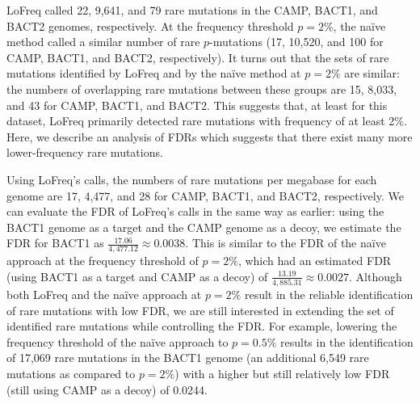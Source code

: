 LoFreq called 22, 9,641, and 79 rare mutations in the CAMP, BACT1, and BACT2 genomes, respectively. At the frequency threshold $p = 2\%$, the na\"ive method called a similar number of rare $p$-mutations (17, 10,520, and 100 for CAMP, BACT1, and BACT2, respectively). It turns out that the sets of rare mutations identified by LoFreq and by the na\"ive method at $p = 2\%$ are similar: the numbers of overlapping rare mutations between these groups are 15, 8,033, and 43 for CAMP, BACT1, and BACT2. This suggests that, at least for this dataset, LoFreq primarily detected rare mutations with frequency of at least 2\%. Here, we describe an analysis of FDRs which suggests that there exist many more lower-frequency rare mutations.

Using LoFreq's calls, the numbers of rare mutations per megabase for each genome are 17, 4,477, and 28 for CAMP, BACT1, and BACT2, respectively. We can evaluate the FDR of LoFreq's calls in the same way as earlier: using the BACT1 genome as a target and the CAMP genome as a decoy, we estimate the FDR for BACT1 as $\frac{17.06}{4,477.12} \approx 0.0038$. This is similar to the FDR of the na\"ive approach at the frequency threshold of $p = 2\%$, which had an estimated FDR (using BACT1 as a target and CAMP as a decoy) of $\frac{13.19}{4,885.31} \approx 0.0027$. Although both LoFreq and the na\"ive approach at $p = 2\%$ result in the reliable identification of rare mutations with low FDR, we are still interested in extending the set of identified rare mutations while controlling the FDR. For example, lowering the frequency threshold of the na\"ive approach to $p = 0.5\%$ results in the identification of 17,069 rare mutations in the BACT1 genome (an additional 6,549 rare mutations as compared to $p = 2\%$) with a higher but still relatively low FDR (still using CAMP as a decoy) of 0.0244.\endinput